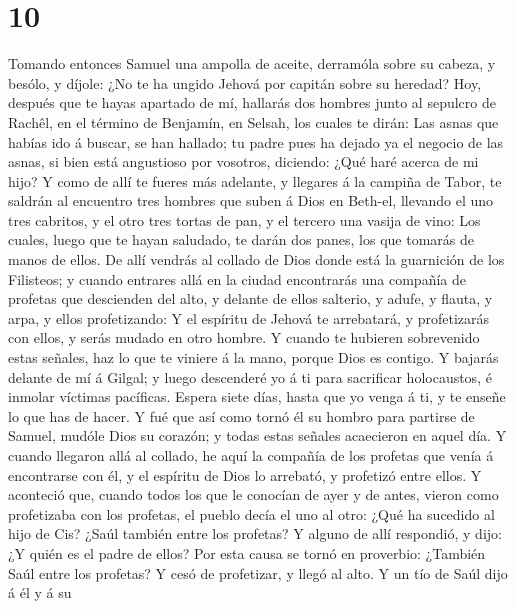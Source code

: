 \hypertarget{section-9}{%
\section{10}\label{section-9}}

 Tomando entonces Samuel una ampolla de aceite, derramóla
sobre su cabeza, y besólo, y díjole: ¿No te ha ungido Jehová por capitán
sobre su heredad?  Hoy, después que te hayas apartado de
mí, hallarás dos hombres junto al sepulcro de Rachêl, en el término de
Benjamín, en Selsah, los cuales te dirán: Las asnas que habías ido á
buscar, se han hallado; tu padre pues ha dejado ya el negocio de las
asnas, si bien está angustioso por vosotros, diciendo: ¿Qué haré acerca
de mi hijo?  Y como de allí te fueres más adelante, y
llegares á la campiña de Tabor, te saldrán al encuentro tres hombres que
suben á Dios en Beth-el, llevando el uno tres cabritos, y el otro tres
tortas de pan, y el tercero una vasija de vino:  Los
cuales, luego que te hayan saludado, te darán dos panes, los que tomarás
de manos de ellos.  De allí vendrás al collado de Dios
donde está la guarnición de los Filisteos; y cuando entrares allá en la
ciudad encontrarás una compañía de profetas que descienden del alto, y
delante de ellos salterio, y adufe, y flauta, y arpa, y ellos
profetizando:  Y el espíritu de Jehová te arrebatará, y
profetizarás con ellos, y serás mudado en otro hombre.  Y
cuando te hubieren sobrevenido estas señales, haz lo que te viniere á la
mano, porque Dios es contigo.  Y bajarás delante de mí á
Gilgal; y luego descenderé yo á ti para sacrificar holocaustos, é
inmolar víctimas pacíficas. Espera siete días, hasta que yo venga á ti,
y te enseñe lo que has de hacer.  Y fué que así como tornó
él su hombro para partirse de Samuel, mudóle Dios su corazón; y todas
estas señales acaecieron en aquel día.  Y cuando llegaron
allá al collado, he aquí la compañía de los profetas que venía á
encontrarse con él, y el espíritu de Dios lo arrebató, y profetizó entre
ellos.  Y aconteció que, cuando todos los que le conocían
de ayer y de antes, vieron como profetizaba con los profetas, el pueblo
decía el uno al otro: ¿Qué ha sucedido al hijo de Cis? ¿Saúl también
entre los profetas?  Y alguno de allí respondió, y dijo:
¿Y quién es el padre de ellos? Por esta causa se tornó en proverbio:
¿También Saúl entre los profetas?  Y cesó de profetizar,
y llegó al alto.  Y un tío de Saúl dijo á él y á su
